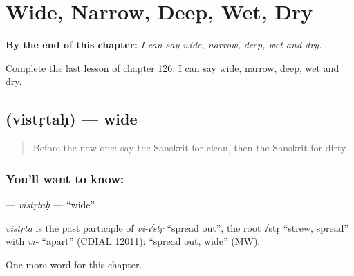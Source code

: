 
\chapter{Wide, Narrow, Deep, Wet, Dry}
\label{ch:sa-wide-narrow-deep-wet-dry}

\begin{chapteropening}
\textbf{By the end of this chapter:} \emph{I can say wide, narrow, deep, wet and dry.}

Complete the last lesson of chapter 126: I can say wide, narrow, deep, wet and dry.
\end{chapteropening}

\section[\texorpdfstring{\sk{विस्तृतः} (vistṛtaḥ)}{विस्तृतः (vistṛtaḥ)}]{ (vistṛtaḥ) — wide}

\label{lesson:SA-C126-vistrtah}



\begin{quote}
Before the new one: say the Sanskrit for clean, then the Sanskrit for dirty.
\end{quote}

\subsection*{You'll want to know: }
\textbf{} — \emph{vistṛtaḥ} — \textquotedblleft{}wide\textquotedblright{}.

\begin{cousinweb}
\emph{vistṛta} is the past participle of \emph{vi-√stṛ} \textquotedblleft{}spread out\textquotedblright{}, the root √stṛ \textquotedblleft{}strew, spread\textquotedblright{} with \emph{vi-} \textquotedblleft{}apart\textquotedblright{} (CDIAL 12011): \textquotedblleft{}spread out, wide\textquotedblright{} (MW).
\end{cousinweb}

\begin{grammarlens}[title={What you've built}]
One more word for this chapter.
\end{grammarlens}

